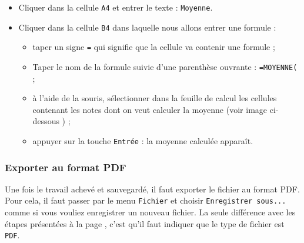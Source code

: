 \begin{itemize}
\item Cliquer dans la cellule \texttt{A4} et entrer le texte : \texttt{Moyenne}. 
\item Cliquer dans la cellule \texttt{B4} dans laquelle nous allons entrer une formule : 
        \begin{itemize}
        \item taper un signe \texttt{=} qui signifie que la cellule va contenir une formule ;
        \item Taper le nom de la formule suivie d'une parenthèse ouvrante : \texttt{=MOYENNE(} ;
        \item à l'aide de la souris, sélectionner dans la feuille de calcul les cellules contenant les notes dont on veut calculer la moyenne (voir image ci-dessous ) ;
        \item appuyer sur la touche \texttt{Entrée} : la moyenne calculée apparaît.
        \end{itemize}
\end{itemize}



\subsubsection{Exporter au format PDF}

Une fois le travail achevé et sauvegardé, il faut exporter le fichier au format PDF. Pour cela, il faut passer par le menu \texttt{Fichier} et choisir \texttt{Enregistrer sous...} comme si vous vouliez enregistrer un nouveau fichier. La seule différence avec les étapes présentées à la page \pageref{ssec_sauvegarder_fichier}, c'est qu'il faut indiquer que le type de fichier est \texttt{PDF}. 







